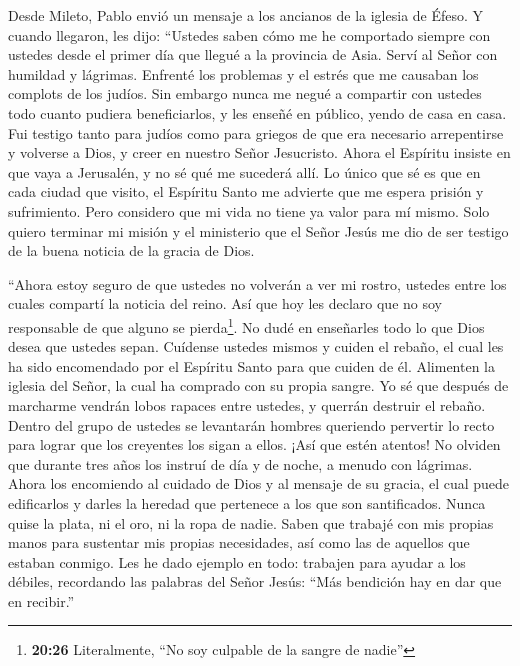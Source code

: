  Desde Mileto, Pablo envió un mensaje a los ancianos de la
iglesia de Éfeso.  Y cuando llegaron, les dijo: ``Ustedes
saben cómo me he comportado siempre con ustedes desde el primer día que
llegué a la provincia de Asia.  Serví al Señor con humildad
y lágrimas. Enfrenté los problemas y el estrés que me causaban los
complots de los judíos.  Sin embargo nunca me negué a
compartir con ustedes todo cuanto pudiera beneficiarlos, y les enseñé en
público, yendo de casa en casa.  Fui testigo tanto para
judíos como para griegos de que era necesario arrepentirse y volverse a
Dios, y creer en nuestro Señor Jesucristo.  Ahora el
Espíritu insiste en que vaya a Jerusalén, y no sé qué me sucederá allí.
 Lo único que sé es que en cada ciudad que visito, el
Espíritu Santo me advierte que me espera prisión y sufrimiento.
 Pero considero que mi vida no tiene ya valor para mí
mismo. Solo quiero terminar mi misión y el ministerio que el Señor Jesús
me dio de ser testigo de la buena noticia de la gracia de Dios.

 ``Ahora estoy seguro de que ustedes no volverán a ver mi
rostro, ustedes entre los cuales compartí la noticia del reino.
 Así que hoy les declaro que no soy responsable de que
alguno se pierda\footnote{\textbf{20:26} Literalmente, ``No soy culpable
  de la sangre de nadie''}.  No dudé en enseñarles todo lo
que Dios desea que ustedes sepan.  Cuídense ustedes mismos
y cuiden el rebaño, el cual les ha sido encomendado por el Espíritu
Santo para que cuiden de él. Alimenten la iglesia del Señor, la cual ha
comprado con su propia sangre.  Yo sé que después de
marcharme vendrán lobos rapaces entre ustedes, y querrán destruir el
rebaño.  Dentro del grupo de ustedes se levantarán hombres
queriendo pervertir lo recto para lograr que los creyentes los sigan a
ellos.  ¡Así que estén atentos! No olviden que durante tres
años los instruí de día y de noche, a menudo con lágrimas. 
Ahora los encomiendo al cuidado de Dios y al mensaje de su gracia, el
cual puede edificarlos y darles la heredad que pertenece a los que son
santificados.  Nunca quise la plata, ni el oro, ni la ropa
de nadie.  Saben que trabajé con mis propias manos para
sustentar mis propias necesidades, así como las de aquellos que estaban
conmigo.  Les he dado ejemplo en todo: trabajen para ayudar
a los débiles, recordando las palabras del Señor Jesús: ``Más bendición
hay en dar que en recibir.''

